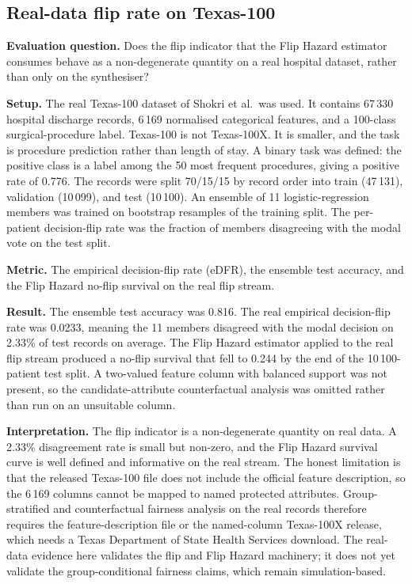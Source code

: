 \documentclass[acmsmall,nonacm,review,anonymous]{acmart}
\newcommand{\1}[1]{\mathbf{1}\!\left\{#1\right\}}
\begin{document}
\subsection{Real-data flip rate on Texas-100}\label{sec:exp_realtexas}

\textbf{Evaluation question.}
Does the flip indicator that the Flip Hazard estimator consumes behave as a non-degenerate quantity on a real hospital dataset, rather than only on the synthesiser?

\textbf{Setup.}
The real Texas-100 dataset of Shokri et al.\ was used. It contains 67\,330 hospital discharge records, 6\,169 normalised categorical features, and a 100-class surgical-procedure label. Texas-100 is not Texas-100X. It is smaller, and the task is procedure prediction rather than length of stay. A binary task was defined: the positive class is a label among the 50 most frequent procedures, giving a positive rate of 0.776. The records were split 70/15/15 by record order into train (47\,131), validation (10\,099), and test (10\,100). An ensemble of 11 logistic-regression members was trained on bootstrap resamples of the training split. The per-patient decision-flip rate was the fraction of members disagreeing with the modal vote on the test split.

\textbf{Metric.}
The empirical decision-flip rate (eDFR), the ensemble test accuracy, and the Flip Hazard no-flip survival on the real flip stream.

\textbf{Result.}
The ensemble test accuracy was 0.816. The real empirical decision-flip rate was 0.0233, meaning the 11 members disagreed with the modal decision on 2.33\% of test records on average. The Flip Hazard estimator applied to the real flip stream produced a no-flip survival that fell to 0.244 by the end of the 10\,100-patient test split. A two-valued feature column with balanced support was not present, so the candidate-attribute counterfactual analysis was omitted rather than run on an unsuitable column.

\textbf{Interpretation.}
The flip indicator is a non-degenerate quantity on real data. A 2.33\% disagreement rate is small but non-zero, and the Flip Hazard survival curve is well defined and informative on the real stream. The honest limitation is that the released Texas-100 file does not include the official feature description, so the 6\,169 columns cannot be mapped to named protected attributes. Group-stratified and counterfactual fairness analysis on the real records therefore requires the feature-description file or the named-column Texas-100X release, which needs a Texas Department of State Health Services download. The real-data evidence here validates the flip and Flip Hazard machinery; it does not yet validate the group-conditional fairness claims, which remain simulation-based.
\end{document}
